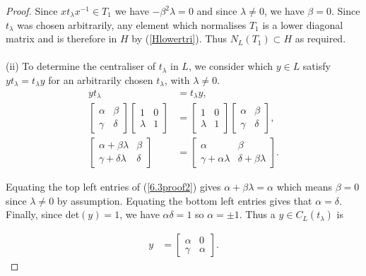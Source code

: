 \begin{proof}
Since $x t_\lambda x^{-1} \in T_1$ we have $\minus \beta^2  \lambda = 0$ and since $\lambda \neq 0$, we have $\beta = 0$. Since $t_\lambda$ was chosen arbitrarily, any element which normalises $T_1$ is a lower diagonal matrix and is therefore in $H$ by (\ref{Hlowertri}). Thus $N_L(T_1) \subset H$ as required. \\
\\
(ii) To determine the centraliser of $t_\lambda$ in $L$, we consider which $y \in L$ satisfy $y t_\lambda = t_\lambda y$ for an arbitrarily chosen $t_\lambda$, with $\lambda \neq 0$. \\
\vspace{-0.5mm}
\begin{align}\label{6.3proof2} y t_\lambda &= t_\lambda y, \nonumber \\[1.5ex]
\begin{bmatrix} \alpha & \beta \\ \gamma & \delta \end{bmatrix} \begin{bmatrix} 1 & 0 \\ \lambda & 1 \end{bmatrix} &= \begin{bmatrix} 1 & 0 \\ \lambda & 1 \end{bmatrix} \begin{bmatrix} \alpha & \beta \\ \gamma & \delta \end{bmatrix}, \nonumber \\[1.5ex]
\begin{bmatrix} \alpha + \beta \lambda & \beta \\ \gamma + \delta \lambda & \delta \end{bmatrix} &= \begin{bmatrix} \alpha & \beta \\ \gamma +  \alpha \lambda & \delta + \beta \lambda \end{bmatrix}.
\end{align}
\vspace{.5mm}

Equating the top left entries of (\ref{6.3proof2}) gives $\alpha + \beta \lambda = \alpha$ which means $\beta = 0$ since $\lambda \neq 0$ by assumption. Equating the bottom left entries gives that $\alpha = \delta$. Finally, since det$(y) = 1$, we have $\alpha \delta = 1$ so $\alpha = \pm 1$. Thus a $y \in C_L(t_\lambda)$ is

\begin{align*} y &= \begin{bmatrix} \alpha & 0 \\ \gamma & \alpha \end{bmatrix}. \tag{where $\alpha = \pm 1$}
\end{align*}


\end{proof}
